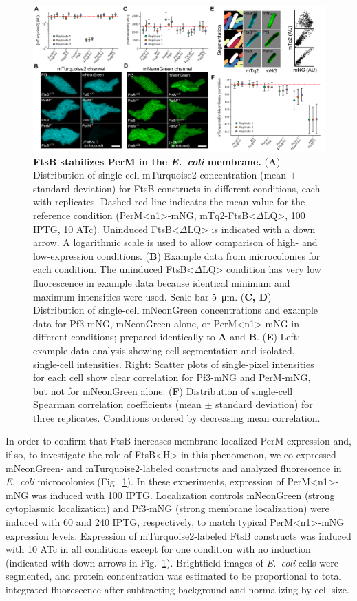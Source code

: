 \documentclass[twocolumn,pdflatex,sn-nature]{sn-jnl}%
\def\textsuperscript#1{<#1>}%
\newcommand\ec{\textit{E.~coli}}
\newcommand\ftsbH{FtsB\textsuperscript{H}}
\newcommand\ftsbdLQ{FtsB\textsuperscript{$\Delta{}$LQ}}
\newcommand\permN{PerM\textsuperscript{n1}}
\begin{document}
\begin{figure}[t]
    \centering
    \includegraphics[width=1.0\textwidth]{../figures/fig3.png}
    \caption{
        \textbf{FtsB stabilizes PerM in the \ec{} membrane.}
        (\textbf{A}) Distribution of single-cell mTurquoise2 concentration (mean $\pm$ standard deviation) for FtsB constructs in different conditions, each with replicates. Dashed red line indicates the mean value for the reference condition (\permN{}-mNG, mTq2-\ftsbdLQ{}, \qty{100}{\uM} IPTG, \qty{10}{\nM} ATc). Uninduced \ftsbdLQ{} is indicated with a down arrow. A logarithmic scale is used to allow comparison of high- and low-expression conditions.
        (\textbf{B}) Example data from microcolonies for each condition. The uninduced \ftsbdLQ{} condition has very low fluorescence in example data because identical minimum and maximum intensities were used. Scale bar \qty{5}{\um}.
        (\textbf{C, D}) Distribution of single-cell mNeonGreen concentrations and example data for Pf3-mNG, mNeonGreen alone, or \permN{}-mNG in different conditions; prepared identically to \textbf{A} and \textbf{B}.
        (\textbf{E}) Left: example data analysis showing cell segmentation and isolated, single-cell intensities. Right: Scatter plots of single-pixel intensities for each cell show clear correlation for Pf3-mNG and PerM-mNG, but not for mNeonGreen alone. (\textbf{F}) Distribution of single-cell Spearman correlation coefficients (mean $\pm$ standard deviation) for three replicates. Conditions ordered by decreasing mean correlation.
    }\label{fig3}
    \end{figure}

In order to confirm that FtsB increases membrane-localized PerM expression and, if so, to investigate the role of \ftsbH{} in this phenomenon, we co-expressed mNeonGreen- and mTurquoise2-labeled constructs and analyzed fluorescence in \ec{} microcolonies (Fig.~\ref{fig3}).
In these experiments, expression of \permN{}-mNG was induced with \qty{100}{\uM} IPTG. Localization controls mNeonGreen (strong cytoplasmic localization) and Pf3-mNG (strong membrane localization) were induced with \qty{60}{\uM} and \qty{240}{\uM} IPTG, respectively, to match typical \permN{}-mNG expression levels.
Expression of mTurquoise2-labeled FtsB constructs was induced with \qty{10}{\nM} ATc in all conditions except for one condition with no induction (indicated with down arrows in Fig.~\ref{fig3}).
Brightfield images of \ec{} cells were segmented, and protein concentration was estimated to be proportional to total integrated fluorescence after subtracting background and normalizing by cell size.
\end{document}
